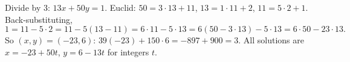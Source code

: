 Divide by $3$: $13x+50y=1$. Euclid: $50=3\cdot13+11$, $13=1\cdot11+2$, $11=5\cdot2+1$. Back-substituting,
\[1=11-5\cdot2=11-5(13-11)=6\cdot11-5\cdot13=6(50-3\cdot13)-5\cdot13=6\cdot50-23\cdot13.\]
So $(x,y)=\boxed{(-23,6)}$: $39(-23)+150\cdot6=-897+900=3$. All solutions are $x=-23+50t$, $y=6-13t$ for integers $t$.
